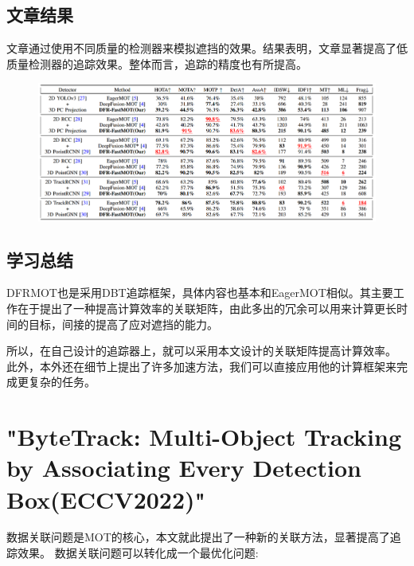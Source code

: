 \section{文章结果}
文章通过使用不同质量的检测器来模拟遮挡的效果。结果表明，文章显著提高了低质量检测器的追踪效果。整体而言，追踪的精度也有所提高。
\begin{figure}
	\centering
	\includegraphics[width=\textwidth]{images/DFRMOT/result.png}
\end{figure}


\section{学习总结}
DFRMOT也是采用DBT追踪框架，具体内容也基本和EagerMOT相似。其主要工作在于提出了一种提高计算效率的关联矩阵，由此多出的冗余可以用来计算更长时间的目标，间接的提高了应对遮挡的能力。

所以，在自己设计的追踪器上，就可以采用本文设计的关联矩阵提高计算效率。
此外，本外还在细节上提出了许多加速方法，我们可以直接应用他的计算框架来完成更复杂的任务。


\chapter{"ByteTrack: Multi-Object Tracking by Associating Every Detection Box(ECCV2022)"\cite{zhang2022bytetrack}}

数据关联问题是MOT的核心，本文就此提出了一种新的关联方法，显著提高了追踪效果。
数据关联问题可以转化成一个最优化问题:


